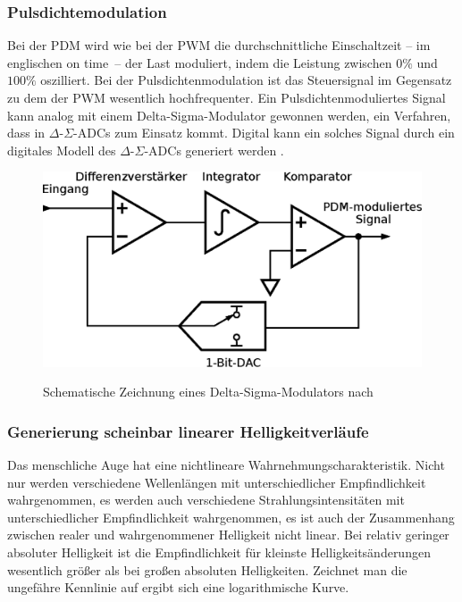 \documentclass[12pt,a4paper,notitlepage]{article}
\begin{document}
\subsubsection{Pulsdichtemodulation}
Bei der \gls{PDM} wird wie bei der \gls{PWM} die durchschnittliche Einschaltzeit -- im englischen \glqq on time\grqq\ -- der Last moduliert, indem die Leistung zwischen $0\%$ und $100\%$ oszilliert. Bei der Pulsdichtenmodulation ist das Steuersignal im Gegensatz zu dem der PWM wesentlich hochfrequenter. Ein Pulsdichtenmoduliertes Signal kann analog mit einem Delta-Sigma-Modulator gewonnen werden, ein Verfahren, dass in $\Delta$-$\Sigma$-ADCs zum Einsatz kommt. \cite{MAXIM21, MAXIM10} Digital kann ein solches Signal durch ein digitales Modell des $\Delta$-$\Sigma$-ADCs generiert werden \cite{WP1, WP3}.
\begin{figure}
\begin{center}
\includegraphics{images/delta-sigma-adc.eps}
\label{delta-sigma-modulator}
\caption{Schematische Zeichnung eines Delta-Sigma-Modulators nach \cite{MAXIM21}}
\end{center}
\end{figure}

\subsubsection{Generierung scheinbar linearer Helligkeitverläufe}
Das menschliche Auge hat eine nichtlineare Wahrnehmungscharakteristik. Nicht nur werden verschiedene Wellenlängen mit unterschiedlicher Empfindlichkeit wahrgenommen, es werden auch verschiedene Strahlungsintensitäten mit unterschiedlicher Empfindlichkeit wahrgenommen, es ist auch der Zusammenhang zwischen realer und wahrgenommener Helligkeit nicht linear. Bei relativ geringer absoluter Helligkeit ist die Empfindlichkeit für kleinste Helligkeitsänderungen wesentlich größer als bei großen absoluten Helligkeiten. Zeichnet man die ungefähre Kennlinie auf ergibt sich eine logarithmische Kurve.
\end{document}
